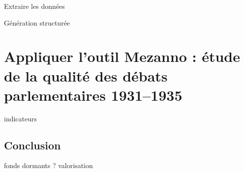 Extraire les données

Génération structurée 

\part{Appliquer l'outil Mezanno : étude de la qualité des débats parlementaires 1931--1935}

indicateurs

\chapter*{Conclusion}
fonds dormants ? valorisation
\newpage{\pagestyle{empty}\cleardoublepage}




